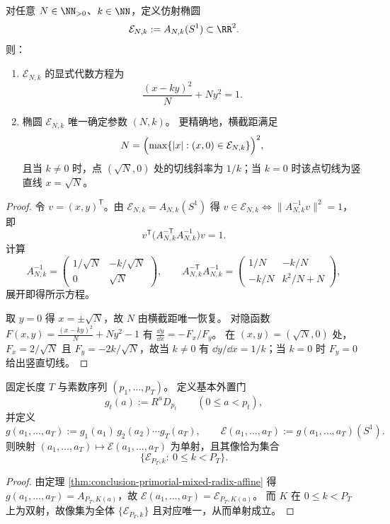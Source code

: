 \begin{proposition}\label{prop:conclusion-godel-affine-ellipse-equation-identifiability}
对任意 \(N\in\NN_{>0}\)、\(k\in\NN\)，定义仿射椭圆
\[
\mathcal E_{N,k}:=A_{N,k}(S^1)\subset \RR^2.
\]
则：
\begin{enumerate}
  \item \(\mathcal E_{N,k}\) 的显式代数方程为
  \[
  \frac{(x-ky)^2}{N}+Ny^2=1.
  \]
  \item 椭圆 \(\mathcal E_{N,k}\) 唯一确定参数 \((N,k)\)。
  更精确地，横截距满足
  \[
  N=\Bigl(\max\{|x|:(x,0)\in\mathcal E_{N,k}\}\Bigr)^2,
  \]
  且当 \(k\neq 0\) 时，点 \((\sqrt N,0)\) 处的切线斜率为 \(1/k\)；当 \(k=0\) 时该点切线为竖直线 \(x=\sqrt N\)。
\end{enumerate}
\end{proposition}
\begin{proof}
令 \(v=(x,y)^{\mathsf T}\)。由 \(\mathcal E_{N,k}=A_{N,k}(S^1)\) 得
\(
v\in\mathcal E_{N,k}\iff \|A_{N,k}^{-1}v\|^2=1
\)，即
\[
v^{\mathsf T}\bigl(A_{N,k}^{-\mathsf T}A_{N,k}^{-1}\bigr)v=1.
\]
计算
\[
A_{N,k}^{-1}=
\begin{pmatrix}
1/\sqrt N&-k/\sqrt N\\
0&\sqrt N
\end{pmatrix},
\qquad
A_{N,k}^{-\mathsf T}A_{N,k}^{-1}
=
\begin{pmatrix}
1/N & -k/N\\
-k/N & k^2/N+N
\end{pmatrix},
\]
展开即得所示方程。
\par
取 \(y=0\) 得 \(x=\pm\sqrt N\)，故 \(N\) 由横截距唯一恢复。
对隐函数 \(F(x,y)=\frac{(x-ky)^2}{N}+Ny^2-1\) 有 \(\frac{\dd y}{\dd x}=-F_x/F_y\)。
在 \((x,y)=(\sqrt N,0)\) 处，
\(
F_x=2/\sqrt N
\) 且
\(
F_y=-2k/\sqrt N
\)，故当 \(k\neq 0\) 有 \(\dd y/\dd x=1/k\)；当 \(k=0\) 时 \(F_y=0\) 给出竖直切线。
\end{proof}

\begin{theorem}[分层外置门的唯一分解与椭圆族充满性]\label{thm:conclusion-primorial-ellipse-unique-factorization}
固定长度 \(T\) 与素数序列 \((p_1,\dots,p_T)\)。
定义基本外置门
\[
g_t(a):=R^{a}D_{p_t}\qquad (0\le a<p_t),
\]
并定义
\[
g(a_1,\dots,a_T):=g_1(a_1)\,g_2(a_2)\cdots g_T(a_T),
\qquad
\mathcal E(a_1,\dots,a_T):=g(a_1,\dots,a_T)(S^1).
\]
则映射 \((a_1,\dots,a_T)\mapsto \mathcal E(a_1,\dots,a_T)\) 为单射，且其像恰为集合
\[
\{\mathcal E_{P_T,k}:\ 0\le k<P_T\}.
\]
\end{theorem}
\begin{proof}
由定理 \ref{thm:conclusion-primorial-mixed-radix-affine} 得
\(
g(a_1,\dots,a_T)=A_{P_T,K(a)}
\)，故
\(
\mathcal E(a_1,\dots,a_T)=\mathcal E_{P_T,K(a)}
\)。
而 \(K\) 在 \(0\le k<P_T\) 上为双射，故像集为全体 \(\{\mathcal E_{P_T,k}\}\) 且对应唯一，从而单射成立。
\end{proof}

